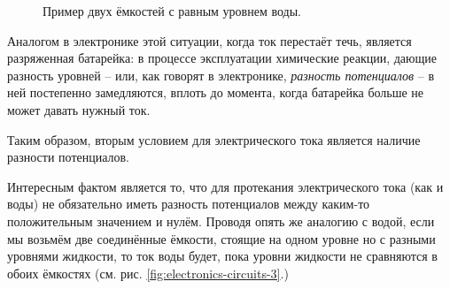 \documentclass[a4paper,twoside]{book}
\begin{document}
\begin{figure}[ht]
  \centering
  \caption{Пример двух ёмкостей с равным уровнем воды.}
  \label{fig:electronics-circuits-2}
\end{figure}

Аналогом в электронике этой ситуации, когда ток перестаёт течь, является
разряженная батарейка: в процессе эксплуатации химические реакции, дающие
разность уровней -- или, как говорят в электронике, \emph{разность потенциалов}
-- в ней постепенно замедляются, вплоть до момента, когда батарейка больше не
может давать нужный ток.

Таким образом, вторым условием для электрического тока является наличие разности
потенциалов.

Интересным фактом является то, что для протекания электрического тока (как и
воды) не обязательно иметь разность потенциалов между каким-то положительным
значением и нулём.  Проводя опять же аналогию с водой, если мы возьмём две
соединённые ёмкости, стоящие на одном уровне но с разными уровнями жидкости, то
ток воды будет, пока уровни жидкости не сравняются в обоих ёмкостях
(см. рис. \ref{fig:electronics-circuits-3}.)
\end{document}
